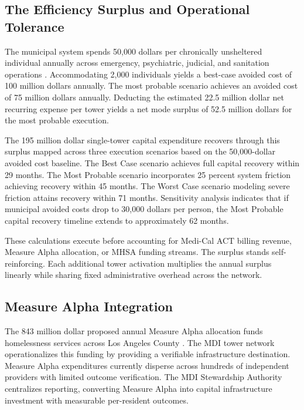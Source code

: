 \documentclass[12pt, letterpaper]{article}
\begin{document}
\subsection{The Efficiency Surplus and Operational Tolerance}

The municipal system spends 50,000 dollars per chronically unsheltered individual annually across emergency, psychiatric, judicial, and sanitation operations \citep{calmatters_2026}. Accommodating 2,000 individuals yields a best-case avoided cost of 100 million dollars annually. The most probable scenario achieves an avoided cost of 75 million dollars annually. Deducting the estimated 22.5 million dollar net recurring expense per tower yields a net mode surplus of 52.5 million dollars for the most probable execution. 

The 195 million dollar single-tower capital expenditure recovers through this surplus mapped across three execution scenarios based on the 50,000-dollar avoided cost baseline. The Best Case scenario achieves full capital recovery within 29 months. The Most Probable scenario incorporates 25 percent system friction achieving recovery within 45 months. The Worst Case scenario modeling severe friction attains recovery within 71 months. Sensitivity analysis indicates that if municipal avoided costs drop to 30,000 dollars per person, the Most Probable capital recovery timeline extends to approximately 62 months.

These calculations execute before accounting for Medi-Cal ACT billing revenue, Measure Alpha allocation, or MHSA funding streams. The surplus stands self-reinforcing. Each additional tower activation multiplies the annual surplus linearly while sharing fixed administrative overhead across the network.

\subsection{Measure Alpha Integration}

The 843 million dollar proposed annual Measure Alpha allocation funds homelessness services across Los Angeles County \citep{lac_ceo_measure_a_2025, lac_homeless_initiative_2025}. The MDI tower network operationalizes this funding by providing a verifiable infrastructure destination. Measure Alpha expenditures currently disperse across hundreds of independent providers with limited outcome verification. The MDI Stewardship Authority centralizes reporting, converting Measure Alpha into capital infrastructure investment with measurable per-resident outcomes.
\end{document}
